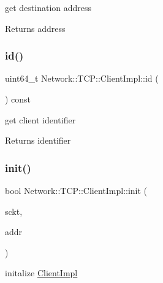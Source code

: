 get destination address 

\begin{DoxyReturn}{Returns}
address 
\end{DoxyReturn}
\mbox{\label{class_network_1_1_t_c_p_1_1_client_impl_acde19485b353bd1224cd8ea9a209d797}} 
\subsubsection{\texorpdfstring{id()}{id()}}
{\footnotesize\ttfamily uint64\+\_\+t Network\+::\+T\+C\+P\+::\+Client\+Impl\+::id (\begin{DoxyParamCaption}{ }\end{DoxyParamCaption}) const\hspace{0.3cm}{\ttfamily [inline]}}



get client identifier 

\begin{DoxyReturn}{Returns}
identifier 
\end{DoxyReturn}
\mbox{\label{class_network_1_1_t_c_p_1_1_client_impl_ac2284b2ba25fc0aec5a62813c68a267b}} 
\subsubsection{\texorpdfstring{init()}{init()}}
{\footnotesize\ttfamily bool Network\+::\+T\+C\+P\+::\+Client\+Impl\+::init (\begin{DoxyParamCaption}\item[{S\+O\+C\+K\+ET \&\&}]{sckt,  }\item[{const sockaddr\+\_\+in \&}]{addr }\end{DoxyParamCaption})}



initalize \hyperlink{class_network_1_1_t_c_p_1_1_client_impl}{Client\+Impl} 


